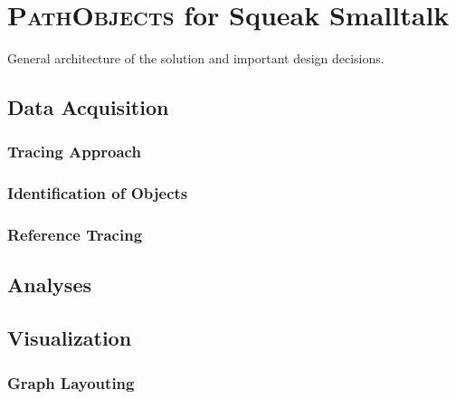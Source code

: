 \chapter{\textsc{PathObjects} for Squeak Smalltalk}
\label{c:implementation}

General architecture of the solution and important design decisions.

\section{Data Acquisition}
\subsection{Tracing Approach}
\subsection{Identification of Objects}
\subsection{Reference Tracing}

\section{Analyses}

\section{Visualization}
\subsection{Graph Layouting}